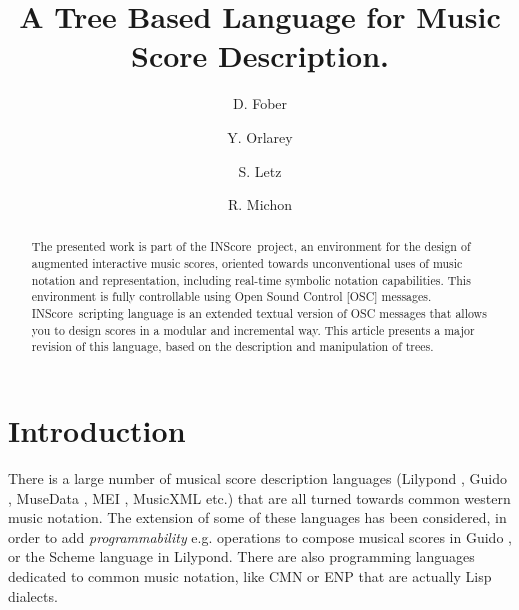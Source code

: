 \documentclass[runningheads]{llncs}
\newcommand{\IS}		{INScore}
\begin{document}
\title{A Tree Based Language for Music Score Description.}

\author{D. Fober \and
Y. Orlarey \and
S. Letz \and R. Michon}
%
%


\maketitle

%
\begin{abstract}
The presented work is part of the \IS\ project, an environment for the design of augmented interactive music scores, oriented towards unconventional uses of music notation and representation, including real-time symbolic notation capabilities. This environment is fully controllable using Open Sound Control [OSC] messages. \IS\ scripting language is an extended textual version of OSC messages that allows you to design scores in a modular and incremental way. This article presents a major revision of this language, based on the description and manipulation of trees.

\end{abstract}
%

\section{Introduction}\label{sec:introduction}

There is a large number of musical score description languages (Lilypond \cite{lilypond03}, Guido \cite{hoos98}, MuseData \cite{Hewlett97}, MEI \cite{Roland_2002}, MusicXML \cite{good01} etc.) that are all turned towards common western music notation. 
The extension of some of these languages has been considered, in order to add \textit{programmability} e.g. operations to compose musical scores in Guido \cite{fober12b}, or the Scheme language in Lilypond.
There are also programming languages dedicated to common music notation, like CMN \cite{Schottstaedt97} or ENP 
\cite{KUUSK06} that are actually Lisp dialects. %
\end{document}
